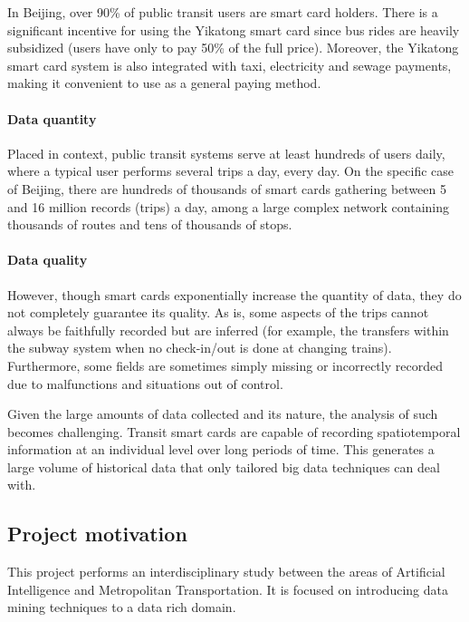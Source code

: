 \documentclass{article}
\begin{document}
In Beijing, over 90\% of public transit users are smart card holders. There is a significant incentive for using the Yikatong smart card since bus rides are heavily subsidized (users have only to pay 50\% of the full price)\cite{ma2017understanding}. Moreover, the Yikatong smart card system is also integrated with taxi, electricity and sewage payments, making it convenient to use as a general paying method.

\paragraph{Data quantity}

Placed in context, public transit systems serve at least hundreds of users daily, where a typical user performs several trips a day, every day. On the specific case of Beijing, there are hundreds of thousands of smart cards gathering between 5 and 16 million records (trips) a day, among a large complex network containing thousands of routes and tens of thousands of stops. 

\paragraph{Data quality}

However, though smart cards exponentially increase the quantity of data, they do not completely guarantee its quality. As is, some aspects of the trips cannot always be faithfully recorded but are inferred (for example, the transfers within the subway system when no check-in/out is done at changing trains). Furthermore, some fields are sometimes simply missing or incorrectly recorded due to malfunctions and situations out of control. 


Given the large amounts of data collected and its nature, the analysis of such becomes challenging. Transit smart cards are capable of recording spatiotemporal information at an individual level over long periods of time. This generates a large volume of historical data that only tailored big data techniques can deal with. 

\subsection{Project motivation}
This project performs an interdisciplinary study between the areas of Artificial Intelligence and Metropolitan Transportation. It is focused on introducing data mining techniques to a data rich domain. 
\end{document}
